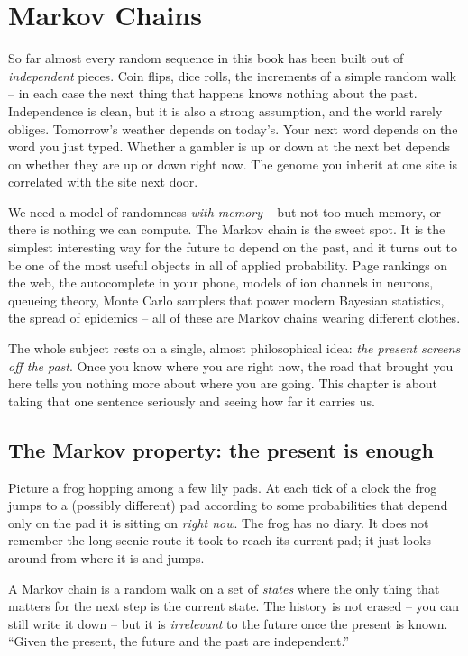 \chapter{Markov Chains}

So far almost every random sequence in this book has been built out of \emph{independent}
pieces. Coin flips, dice rolls, the increments of a simple random walk -- in each case the
next thing that happens knows nothing about the past. Independence is clean, but it is also
a strong assumption, and the world rarely obliges. Tomorrow's weather depends on today's.
Your next word depends on the word you just typed. Whether a gambler is up or down at the
next bet depends on whether they are up or down right now. The genome you inherit at one
site is correlated with the site next door.

We need a model of randomness \emph{with memory} -- but not too much memory, or there is
nothing we can compute. The Markov chain is the sweet spot. It is the simplest interesting
way for the future to depend on the past, and it turns out to be one of the most useful
objects in all of applied probability. Page rankings on the web, the autocomplete in your
phone, models of ion channels in neurons, queueing theory, Monte Carlo samplers that power
modern Bayesian statistics, the spread of epidemics -- all of these are Markov chains
wearing different clothes.

The whole subject rests on a single, almost philosophical idea: \emph{the present screens
off the past}. Once you know where you are right now, the road that brought you here tells
you nothing more about where you are going. This chapter is about taking that one sentence
seriously and seeing how far it carries us.

\chapterline

\section{The Markov property: the present is enough}
\label{ch23:markov-property}

Picture a frog hopping among a few lily pads. At each tick of a clock the frog jumps to a
(possibly different) pad according to some probabilities that depend only on the pad it is
sitting on \emph{right now}. The frog has no diary. It does not remember the long scenic
route it took to reach its current pad; it just looks around from where it is and jumps.

\begin{intuitionbox}
A Markov chain is a random walk on a set of \emph{states} where the only thing that matters
for the next step is the current state. The history is not erased -- you can still write it
down -- but it is \emph{irrelevant} to the future once the present is known. ``Given the
present, the future and the past are independent.''
\end{intuitionbox}


